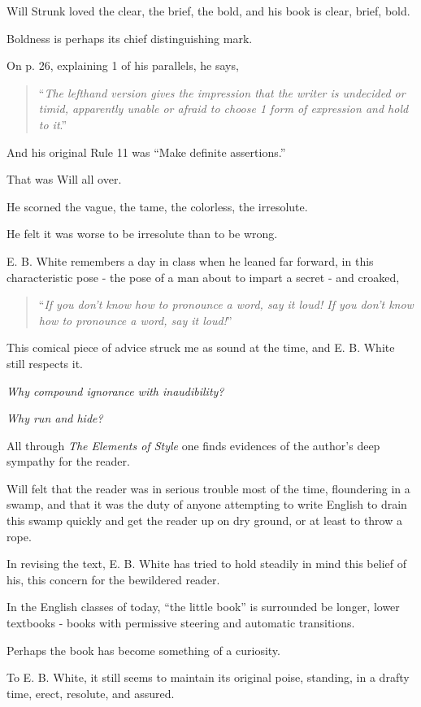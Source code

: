 \documentclass{book}
\numberwithin{equation}{section}
\begin{document}
Will Strunk loved the clear, the brief, the bold, and his book is clear, brief, bold.

Boldness is perhaps its chief distinguishing mark.

On p. 26, explaining 1 of his parallels, he says,
\begin{quotation}
    ``\textit{The lefthand version gives the impression that the writer is undecided or timid, apparently unable or afraid to choose 1 form of expression and hold to it}.''
\end{quotation}
And his original Rule 11 was ``Make definite assertions.''

That was Will all over.

He scorned the vague, the tame, the colorless, the irresolute.

He felt it was worse to be irresolute than to be wrong.

E. B. White remembers a day in class when he leaned far forward, in this characteristic pose - the pose of a man about to impart a secret - and croaked,
\begin{quotation}
    ``\textit{If you don't know how to pronounce a word, say it loud! If you don't know how to pronounce a word, say it loud!}''
\end{quotation}
This comical piece of advice struck me as sound at the time, and E. B. White still respects it.

\textit{Why compound ignorance with inaudibility?}

\textit{Why run and hide?}

%
All through \textit{The Elements of Style} one finds evidences of the author's deep sympathy for the reader.

Will felt that the reader was in serious trouble most of the time, floundering in a swamp, and that it was the duty of anyone attempting to write English to drain this swamp quickly and get the reader up on dry ground, or at least to throw a rope.

In revising the text, E. B. White has tried to hold steadily in mind this belief of his, this concern for the bewildered reader.

%
In the English classes of today, ``the little book'' is surrounded be longer, lower textbooks - books with permissive steering and automatic transitions.

Perhaps the book has become something of a curiosity.

To E. B. White, it still seems to maintain its original poise, standing, in a drafty time, erect, resolute, and assured.
\end{document}
